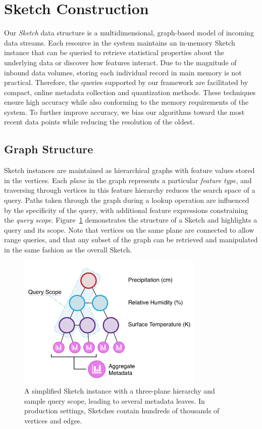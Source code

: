 \section{Sketch Construction}
\label{sec:sketch}
Our \emph{Sketch} data structure is a multidimensional, graph-based model of incoming data streams. Each resource in the system maintains an in-memory Sketch instance that can be queried to retrieve statistical properties about the underlying data or discover how features interact. Due to the magnitude of inbound data volumes, storing each individual record in main memory is not practical. Therefore, the queries supported by our framework are facilitated by compact, online metadata collection and quantization methods. These techniques ensure high accuracy while also conforming to the memory requirements of the system. To further improve accuracy, we bias our algorithms toward the most recent data points while reducing the resolution of the oldest.

\subsection{Graph Structure}
Sketch instances are maintained as hierarchical graphs with feature values stored in the vertices. Each \emph{plane} in the graph represents a particular \emph{feature type}, and traversing through vertices in this feature hierarchy reduces the search space of a query. Paths taken through the graph during a lookup operation are influenced by the specificity of the query, with additional feature expressions constraining the \emph{query scope}. Figure~\ref{fig:sketch} demonstrates the structure of a Sketch and highlights a query and its scope. Note that vertices on the same plane are connected to allow range queries, and that any subset of the graph can be retrieved and manipulated in the same fashion as the overall Sketch.

\begin{figure}
    \centerline{\includegraphics[width=3.5in]{figures/sketch.pdf}}
    \caption{A simplified Sketch instance with a three-plane hierarchy and sample query scope, leading to several metadata leaves. In production settings, Sketches contain hundreds of thousands of vertices and edges.}
    \label{fig:sketch}
\end{figure}

